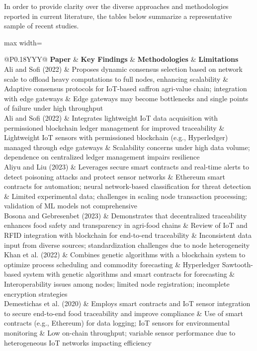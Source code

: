 \documentclass[12pt,onecolumn]{IEEEtran} %
\newcommand{\fitToPage}[1]{\begin{adjustbox}{max width=\textwidth}#1\end{adjustbox}}
\renewcommand{\arraystretch}{1.2} %
\begin{document}
In order to provide clarity over the diverse approaches and methodologies reported in current literature, the tables below summarize a representative sample of recent studies.

\begin{table}[H]
\caption{Comparison of Selected Papers in Blockchain-enabled Smart Agriculture}
\label{tab:comparison}
\centering
\fitToPage{
\begingroup
\setlength{\tabcolsep}{4pt}
\renewcommand{\arraystretch}{1.15}
\footnotesize
\begin{tabularx}{\textwidth}{@{}P{0.18\textwidth}YYY@{}}
\toprule
\textbf{Paper} & \textbf{Key Findings} & \textbf{Methodologies} & \textbf{Limitations} \\
\midrule
Ali and Sofi (2022) & Proposes dynamic consensus selection based on network scale to offload heavy computations to full nodes, enhancing scalability & Adaptive consensus protocols for IoT-based saffron agri-value chain; integration with edge gateways & Edge gateways may become bottlenecks and single points of failure under high throughput \\
\addlinespace
Ali and Sofi (2022) & Integrates lightweight IoT data acquisition with permissioned blockchain ledger management for improved traceability & Lightweight IoT sensors with permissioned blockchain (e.g., Hyperledger) managed through edge gateways & Scalability concerns under high data volume; dependence on centralized ledger management impairs resilience \\
\addlinespace
Aliyu and Liu (2023) & Leverages secure smart contracts and real-time alerts to detect poisoning attacks and protect sensor networks & Ethereum smart contracts for automation; neural network-based classification for threat detection & Limited experimental data; challenges in scaling node transaction processing; validation of ML models not comprehensive \\
\addlinespace
Bosona and Gebresenbet (2023) & Demonstrates that decentralized traceability enhances food safety and transparency in agri-food chains & Review of IoT and RFID integration with blockchain for end-to-end traceability & Inconsistent data input from diverse sources; standardization challenges due to node heterogeneity \\
\addlinespace
Khan et al. (2022) & Combines genetic algorithms with a blockchain system to optimize process scheduling and commodity forecasting & Hyperledger Sawtooth-based system with genetic algorithms and smart contracts for forecasting & Interoperability issues among nodes; limited node registration; incomplete encryption strategies \\
\addlinespace
Demestichas et al. (2020) & Employs smart contracts and IoT sensor integration to secure end-to-end food traceability and improve compliance & Use of smart contracts (e.g., Ethereum) for data logging; IoT sensors for environmental monitoring & Low on-chain throughput; variable sensor performance due to heterogeneous IoT networks impacting efficiency \\
\bottomrule
\end{tabularx}
\endgroup
}
\end{table}
\end{document}

